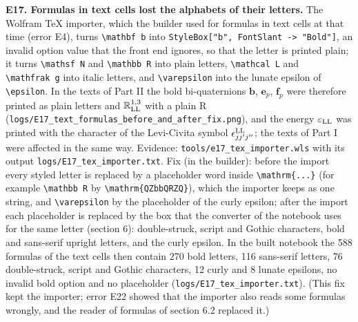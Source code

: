 \documentclass[
  10pt,
]{article}
\begin{document}
\textbf{E17. Formulas in text cells lost the alphabets of their
letters.} The Wolfram TeX importer, which the builder used for formulas
in text cells at that time (error E4), turns
\texttt{\textbackslash{}mathbf\ b} into
\texttt{StyleBox{[}"b",\ FontSlant\ -\textgreater{}\ "Bold"{]}}, an
invalid option value that the front end ignores, so that the letter is
printed plain; it turns \texttt{\textbackslash{}mathsf\ N} and
\texttt{\textbackslash{}mathbb\ R} into plain letters,
\texttt{\textbackslash{}mathcal\ L} and
\texttt{\textbackslash{}mathfrak\ g} into italic letters, and
\texttt{\textbackslash{}varepsilon} into the lunate epsilon of
\texttt{\textbackslash{}epsilon}. In the texts of Part II the bold
bi-quaternions \(\mathbf b\), \(\mathbf e_p\), \(\mathbf f_p\) were
therefore printed as plain letters and \(\mathbb R^{1,3}_{\rm LL}\) with
a plain R
(\texttt{logs/E17\_text\_formulas\_before\_and\_after\_fix.png}), and
the energy \(\varepsilon_{\rm LL}\) was printed with the character of
the Levi-Civita symbol \(\epsilon^{\rm LL}_{jj'j''}\); the texts of Part
I were affected in the same way. Evidence:
\texttt{tools/e17\_tex\_importer.wls} with its output
\texttt{logs/E17\_tex\_importer.txt}. Fix (in the builder): before the
import every styled letter is replaced by a placeholder word inside
\texttt{\textbackslash{}mathrm\{...\}} (for example
\texttt{\textbackslash{}mathbb\ R} by
\texttt{\textbackslash{}mathrm\{QZbbQRZQ\}}), which the importer keeps
as one string, and \texttt{\textbackslash{}varepsilon} by the
placeholder of the curly epsilon; after the import each placeholder is
replaced by the box that the converter of the notebook uses for the same
letter (section 6): double-struck, script and Gothic characters, bold
and sans-serif upright letters, and the curly epsilon. In the built
notebook the 588 formulas of the text cells then contain 270 bold
letters, 116 sans-serif letters, 76 double-struck, script and Gothic
characters, 12 curly and 8 lunate epsilons, no invalid bold option and
no placeholder (\texttt{logs/E17\_tex\_importer.txt}). (This fix kept
the importer; error E22 showed that the importer also reads some
formulas wrongly, and the reader of formulas of section 6.2 replaced
it.)
\end{document}
